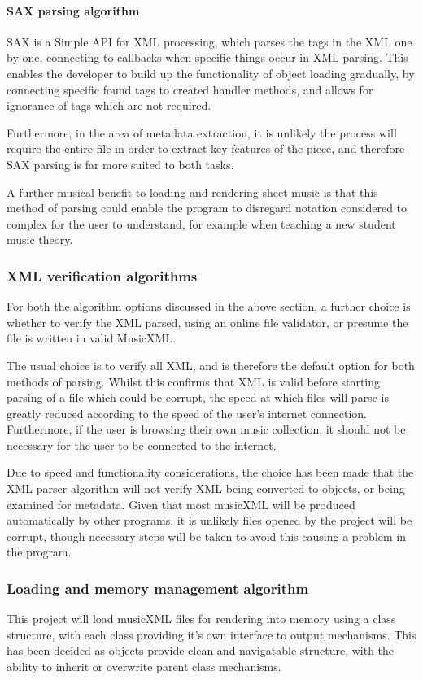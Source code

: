 \paragraph{SAX parsing algorithm}
SAX is a Simple API for XML processing, which parses the tags in the XML one by one, connecting to callbacks when specific things occur in XML parsing. This enables the developer to build up the functionality of object loading gradually, by connecting specific found tags to created handler methods, and allows for ignorance of tags which are not required.

Furthermore, in the area of metadata extraction, it is unlikely the process will require the entire file in order to extract key features of the piece, and therefore SAX parsing is far more suited to both tasks.

A further musical benefit to loading and rendering sheet music is that this method of parsing could enable the program to disregard notation considered to complex for the user to understand, for example when teaching a new student music theory.

\subsubsection{XML verification algorithms}
For both the algorithm options discussed in the above section, a further choice is whether to verify the XML parsed, using an online file validator, or presume the file is written in valid MusicXML. 

The usual choice is to verify all XML, and is therefore the default option for both methods of parsing. Whilst this confirms that XML is valid before starting parsing of a file which could be corrupt, the speed at which files will parse is greatly reduced according to the speed of the user's internet connection.
Furthermore, if the user is browsing their own music collection, it should not be necessary for the user to be connected to the internet.

Due to speed and functionality considerations, the choice has been made that the XML parser algorithm will not verify XML being converted to objects, or being examined for metadata. Given that most musicXML will be produced automatically by other programs, it is unlikely files opened by the project will be corrupt, though necessary steps will be taken to avoid this causing a problem in the program.

\subsubsection{Loading and memory management algorithm}
This project will load musicXML files for rendering into memory using a class structure, with each class providing it's own interface to output mechanisms. This has been decided as objects provide clean and navigatable structure, with the ability to inherit or overwrite parent class mechanisms.

